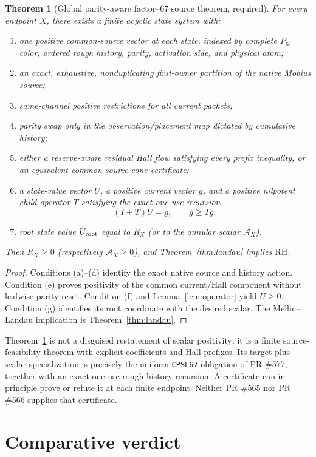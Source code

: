 \documentclass[11pt]{article}
\newtheorem{theorem}{Theorem}[section]
\newcommand{\RH}{\ensuremath{\mathrm{RH}}}
\newcommand{\1}{\mathbf 1}
\begin{document}
\begin{theorem}[Global parity-aware factor--67 source theorem, required]\label{thm:required}
For every endpoint $X$, there exists a finite acyclic state system with:
\begin{enumerate}[label=(\alph*)]
\item one positive common-source vector at each state, indexed by complete $P_{61}$ color, ordered rough history, parity, activation side, and physical atom;
\item an exact, exhaustive, nonduplicating first-owner partition of the native Mobius source;
\item same-channel positive restrictions for all current packets;
\item parity swap only in the observation/placement map dictated by cumulative history;
\item either a reserve-aware residual Hall flow satisfying every prefix inequality, or an equivalent common-source cone certificate;
\item a state-value vector $U$, a positive current vector $g$, and a positive nilpotent child operator $T$ satisfying the exact one-use recursion
\[
(I+T)U=g,
\qquad g\ge Tg;
\]
\item root state value $U_{\rm root}$ equal to $R_X$ (or to the annular scalar $\mathcal A_X$).
\end{enumerate}
Then $R_X\ge0$ (respectively $\mathcal A_X\ge0$), and Theorem~\ref{thm:landau} implies \RH.
\end{theorem}
\begin{proof}
Conditions (a)--(d) identify the exact native source and history action.  Condition (e) proves positivity of the common current/Hall component without leafwise parity reset.  Condition (f) and Lemma~\ref{lem:operator} yield $U\ge0$.  Condition (g) identifies its root coordinate with the desired scalar.  The Mellin--Landau implication is Theorem~\ref{thm:landau}.
\end{proof}

Theorem~\ref{thm:required} is not a disguised restatement of scalar positivity: it is a finite source-feasibility theorem with explicit coefficients and Hall prefixes.  Its target-plus-scalar specialization is precisely the uniform \texttt{CPSL67} obligation of PR \#577, together with an exact one-use rough-history recursion.  A certificate can in principle prove or refute it at each finite endpoint.  Neither PR \#565 nor PR \#566 supplies that certificate.

\section{Comparative verdict}
\end{document}
